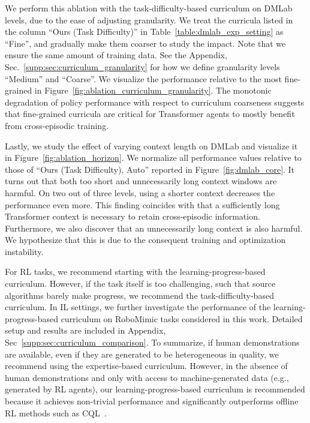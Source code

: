 \vspace{-0.5em}

 We perform this ablation with the task-difficulty-based curriculum on DMLab levels, due to the ease of adjusting granularity.
We treat the curricula listed in the column ``Ours (Task Difficulty)'' in Table~\ref{table:dmlab_exp_setting} as ``Fine'', and gradually make them coarser to study the impact.
Note that we ensure the same amount of training data.
See the Appendix, Sec.~\ref{supp:sec:curriculum_granularity} for how we define granularity levels ``Medium'' and ``Coarse''.
We visualize the performance relative to the most fine-grained in Figure~\ref{fig:ablation_curriculum_granularity}.
The monotonic degradation of policy performance with respect to curriculum coarseness suggests that fine-grained curricula are critical for Transformer agents to mostly benefit from cross-episodic training.



\vspace{-0.5em}

Lastly, we study the effect of varying context length on DMLab and visualize it in Figure~\ref{fig:ablation_horizon}.
We normalize all performance values relative to those of ``Ours (Task Difficulty), Auto'' reported in Figure~\ref{fig:dmlab_core}.
It turns out that both too short and unnecessarily long context windows are harmful.
On two out of three levels, using a shorter context decreases the performance even more.
This finding coincides with \citet{laskin2023incontext} that a sufficiently long Transformer context is necessary to retain cross-episodic information.
Furthermore, we also discover that an unnecessarily long context is also harmful.
We hypothesize that this is due to the consequent training and optimization instability.

For RL tasks, we recommend starting with the learning-progress-based curriculum. However, if the task itself is too challenging, such that source algorithms barely make progress, we recommend the task-difficulty-based curriculum.
In IL settings, we further investigate the performance of the learning-progress-based curriculum on RoboMimic tasks considered in this work. Detailed setup and results are included in Appendix, Sec~\ref{supp:sec:curriculum_comparison}. To summarize, if human demonstrations are available, even if they are generated to be heterogeneous in quality, we recommend using the expertise-based curriculum. However, in the absence of human demonstrations and only with access to machine-generated data (e.g., generated by RL agents), our learning-progress-based curriculum is recommended because it achieves non-trivial performance and significantly outperforms offline RL methods such as CQL~\citep{kumar2020conservative}. 